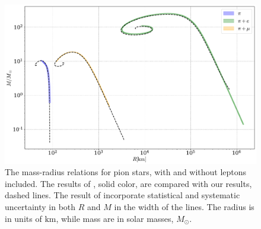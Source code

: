 \begin{figure}[!htb]
    \centering
    \includegraphics[width=\textwidth]{../scripts/figurer/pion_star/mass_radius_brandt.pdf}
    \caption{
        The mass-radius relations for pion stars, with and without leptons included.
        The results of \citeauthor{brandtNewClassCompact2018}, solid color, are compared with our results, dashed lines.
        The result of \citeauthor{brandtNewClassCompact2018} incorporate statistical and systematic uncertainty in both $R$ and $M$ in the width of the lines.
        The radius is in units of $\text{km}$, while mass are in solar masses, $M_\odot$.
    }
    \label{fig: brandt mass-radius}
\end{figure}

